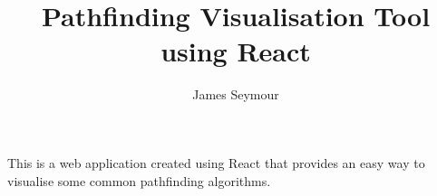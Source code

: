 \documentclass{article}
\title{Pathfinding Visualisation Tool using React}
\author{James Seymour}
\begin{document}
\maketitle
    This is a web application created using React that provides an easy way to visualise some common pathfinding algorithms.
\end{document}
